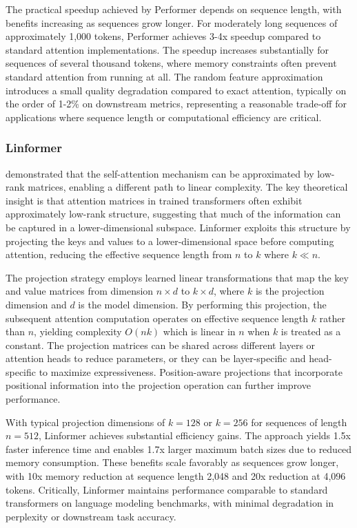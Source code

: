 \documentclass[11pt,letterpaper]{article}
\begin{document}
The practical speedup achieved by Performer depends on sequence length, with benefits increasing as sequences grow longer. For moderately long sequences of approximately 1,000 tokens, Performer achieves 3-4x speedup compared to standard attention implementations. The speedup increases substantially for sequences of several thousand tokens, where memory constraints often prevent standard attention from running at all. The random feature approximation introduces a small quality degradation compared to exact attention, typically on the order of 1-2\% on downstream metrics, representing a reasonable trade-off for applications where sequence length or computational efficiency are critical.

\subsubsection{Linformer}

\cite{wang2020linformer} demonstrated that the self-attention mechanism can be approximated by low-rank matrices, enabling a different path to linear complexity. The key theoretical insight is that attention matrices in trained transformers often exhibit approximately low-rank structure, suggesting that much of the information can be captured in a lower-dimensional subspace. Linformer exploits this structure by projecting the keys and values to a lower-dimensional space before computing attention, reducing the effective sequence length from $n$ to $k$ where $k \ll n$.

The projection strategy employs learned linear transformations that map the key and value matrices from dimension $n \times d$ to $k \times d$, where $k$ is the projection dimension and $d$ is the model dimension. By performing this projection, the subsequent attention computation operates on effective sequence length $k$ rather than $n$, yielding complexity $O(nk)$ which is linear in $n$ when $k$ is treated as a constant. The projection matrices can be shared across different layers or attention heads to reduce parameters, or they can be layer-specific and head-specific to maximize expressiveness. Position-aware projections that incorporate positional information into the projection operation can further improve performance.

With typical projection dimensions of $k=128$ or $k=256$ for sequences of length $n=512$, Linformer achieves substantial efficiency gains. The approach yields 1.5x faster inference time and enables 1.7x larger maximum batch sizes due to reduced memory consumption. These benefits scale favorably as sequences grow longer, with 10x memory reduction at sequence length 2,048 and 20x reduction at 4,096 tokens. Critically, Linformer maintains performance comparable to standard transformers on language modeling benchmarks, with minimal degradation in perplexity or downstream task accuracy.
\end{document}
